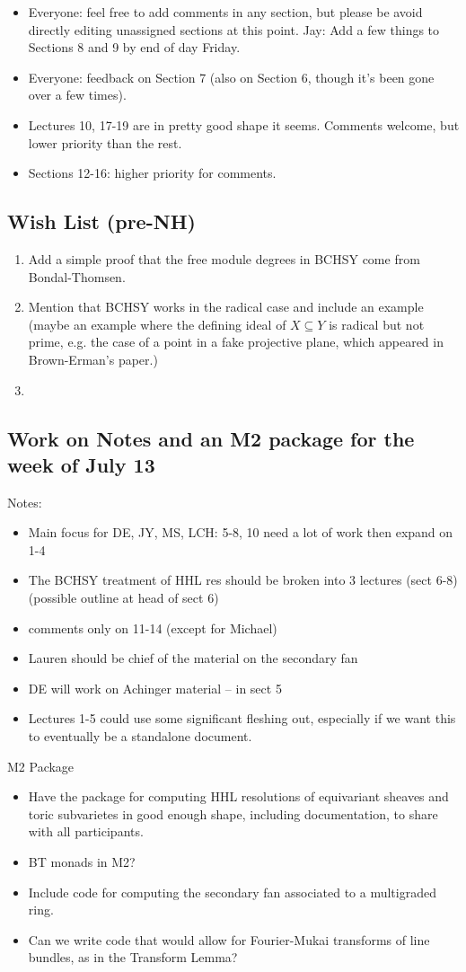\begin{itemize}
\item Everyone: feel free to add comments in any section, but please be avoid directly editing unassigned sections at this point.
  Jay: Add a few things to Sections 8 and 9 by end of day Friday.
\item Everyone:  feedback on Section 7 (also on Section 6, though it’s been gone over a few times).
\item Lectures 10, 17-19 are in pretty good shape it seems.  Comments welcome, but lower priority than the rest.
\item Sections 12-16: higher priority for comments.
\end{itemize}

\subsection{Wish List (pre-NH)}
\begin{enumerate}
\item  Add a simple proof that the free module degrees in BCHSY come from Bondal-Thomsen.
\item  Mention that BCHSY works in the radical case and include an example (maybe an example where the defining ideal of $X\subseteq Y$ is radical but not prime, e.g. the case of a point in a fake projective plane, which appeared in Brown-Erman's paper.)
\item
\end{enumerate}

\subsection{Work on Notes and an M2 package for the week of July 13}
Notes:
\begin{itemize}
\item Main focus for DE, JY, MS, LCH: 5-8, 10 need a lot of work then expand on 1-4
\item The BCHSY treatment of HHL res should be broken into 3 lectures (sect 6-8) (possible outline at head of sect 6)
\item comments only on 11-14 (except for Michael)
\item Lauren should be chief of the material on the secondary fan
\item DE will work on Achinger material --  in sect 5
\item Lectures 1-5 could use some significant fleshing out, especially if we want this to eventually be a standalone document.
\end{itemize}

M2 Package
\begin{itemize}
\item  Have the package for computing HHL resolutions of equivariant sheaves and toric subvarietes in good enough shape, including documentation, to share with all participants.
\item BT monads in M2?
\item  Include code for computing the secondary fan associated to a multigraded ring.
\item  Can we write code that would allow for Fourier-Mukai transforms of line bundles, as in the Transform Lemma?
\end{itemize}
